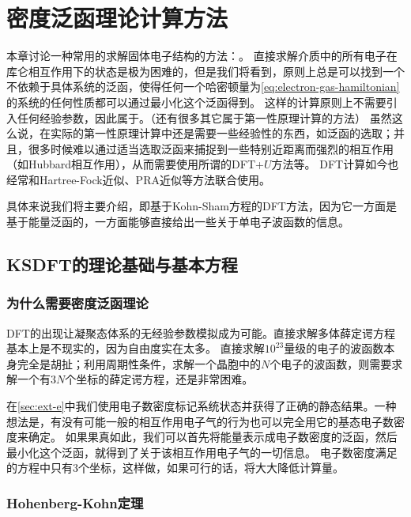 \chapter{密度泛函理论计算方法}\label{chap:dft}

本章讨论一种常用的求解固体电子结构的方法：。
直接求解介质中的所有电子在库仑相互作用下的状态是极为困难的，但是我们将看到，原则上总是可以找到一个不依赖于具体系统的泛函，使得任何一个哈密顿量为\eqref{eq:electron-gas-hamiltonian}的系统的任何性质都可以通过最小化这个泛函得到。
这样的计算原则上不需要引入任何经验参数，因此属于。（还有很多其它属于第一性原理计算的方法）
虽然这么说，在实际的第一性原理计算中还是需要一些经验性的东西，如泛函的选取；并且，很多时候难以通过适当选取泛函来捕捉到一些特别近距离而强烈的相互作用（如Hubbard相互作用），从而需要使用所谓的DFT+$U$方法等。
DFT计算如今也经常和Hartree-Fock近似、PRA近似等方法联合使用。

具体来说我们将主要介绍，即基于Kohn-Sham方程的DFT方法，因为它一方面是基于能量泛函的，一方面能够直接给出一些关于单电子波函数的信息。

\section{KSDFT的理论基础与基本方程}\label{sec:ksdft-basic-theory}

\subsection{为什么需要密度泛函理论}

DFT的出现让凝聚态体系的无经验参数模拟成为可能。直接求解多体薛定谔方程基本上是不现实的，因为自由度实在太多。
直接求解$10^{23}$量级的电子的波函数本身完全是胡扯；利用周期性条件，求解一个晶胞中的$N$个电子的波函数，则需要求解一个有$3N$个坐标的薛定谔方程，还是非常困难。

在\autoref{sec:ext-e}中我们使用电子数密度标记系统状态并获得了正确的静态结果。一种想法是，有没有可能一般的相互作用电子气的行为也可以完全用它的基态电子数密度来确定。
如果果真如此，我们可以首先将能量表示成电子数密度的泛函，然后最小化这个泛函，就得到了关于该相互作用电子气的一切信息。
电子数密度满足的方程中只有$3$个坐标，这样做，如果可行的话，将大大降低计算量。

\subsection{Hohenberg-Kohn定理}\label{sec:hohenberg-kohn-theorem-spinless}


